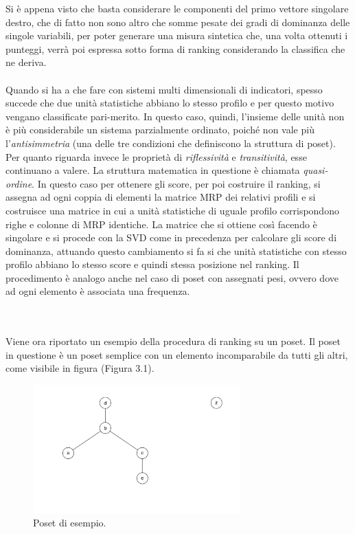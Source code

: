 \documentclass{report}
\begin{document}
Si è appena visto che basta considerare le componenti del primo vettore singolare destro, che di fatto non sono altro che somme pesate dei gradi di dominanza delle singole variabili, per poter generare una misura sintetica che, una volta ottenuti i punteggi, verrà poi espressa sotto forma di ranking considerando la classifica che ne deriva.
\\~\\
Quando si ha a che fare con sistemi multi dimensionali di indicatori, spesso succede che due unità statistiche abbiano lo stesso profilo e per questo motivo vengano classificate pari-merito. In questo caso, quindi, l'insieme delle unità non è più considerabile un sistema parzialmente ordinato, poiché non vale più l'\textit{antisimmetria} (una delle tre condizioni che definiscono la struttura di poset). Per quanto riguarda invece le proprietà di \textit{riflessività} e \textit{transitività}, esse continuano a valere. La struttura matematica in questione è chiamata \textit{quasi-ordine}. In questo caso per ottenere gli score, per poi costruire il ranking, si assegna ad ogni coppia di elementi la matrice MRP dei relativi profili e si costruisce una matrice in cui a unità statistiche di uguale profilo corrispondono righe e colonne di MRP identiche.
La matrice che si ottiene così facendo è singolare e si procede con la SVD come in precedenza per calcolare gli score di dominanza, attuando questo cambiamento si fa si che unità statistiche con stesso profilo abbiano lo stesso score e quindi stessa posizione nel ranking. Il procedimento è analogo anche nel caso di poset con assegnati pesi, ovvero dove ad ogni elemento è associata una frequenza.




\\~\\
Viene ora riportato un esempio della procedura di ranking su un poset.
Il poset in questione è un poset semplice con un elemento incomparabile da tutti gli altri, come visibile in figura (Figura 3.1).

\begin{figure}[H]
    \centering
    \includegraphics[width=8cm]{IMAGES/poset_11.png}
    \caption{Poset di esempio.}
    \label{fig:roc}
\end{figure}
\end{document}
